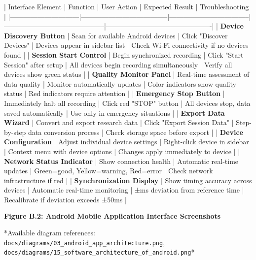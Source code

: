 \documentclass[11pt,a4paper]{article}
\begin{document}
| Interface Element            | Function                             | User Action                       | Expected Result                            | Troubleshooting                              |
|------------------------------|--------------------------------------|-----------------------------------|--------------------------------------------|----------------------------------------------|
| \textbf{Device Discovery Button}  | Scan for available Android devices   | Click "Discover Devices"          | Devices appear in sidebar list             | Check Wi-Fi connectivity if no devices found |
| \textbf{Session Start Control}    | Begin synchronized recording         | Click "Start Session" after setup | All devices begin recording simultaneously | Verify all devices show green status         |
| \textbf{Quality Monitor Panel}    | Real-time assessment of data quality | Monitor automatically updates     | Color indicators show quality status       | Red indicators require attention             |
| \textbf{Emergency Stop Button}    | Immediately halt all recording       | Click red "STOP" button           | All devices stop, data saved automatically | Use only in emergency situations             |
| \textbf{Export Data Wizard}       | Convert and export research data     | Click "Export Session Data"       | Step-by-step data conversion process       | Check storage space before export            |
| \textbf{Device Configuration}     | Adjust individual device settings    | Right-click device in sidebar     | Context menu with device options           | Changes apply immediately to device          |
| \textbf{Network Status Indicator} | Show connection health               | Automatic real-time updates       | Green=good, Yellow=warning, Red=error      | Check network infrastructure if red          |
| \textbf{Synchronization Display}  | Show timing accuracy across devices  | Automatic real-time monitoring    | ±ms deviation from reference time          | Recalibrate if deviation exceeds ±50ms       |

\textbf{Figure B.2: Android Mobile Application Interface Screenshots}

*Available diagram
references: \texttt{docs/diagrams/03\_android\_app\_architecture.png}, \texttt{docs/diagrams/15\_software\_architecture\_of\_android.png}*
\end{document}
